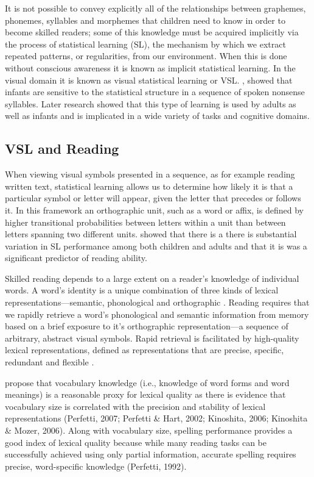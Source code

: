 \documentclass[review]{elsarticle}
\begin{document}
It is not possible to convey explicitly all of the relationships between graphemes, phonemes, syllables and morphemes that children need to know in order to become skilled readers; some of this knowledge must be acquired implicitly via the process of statistical learning (SL), the mechanism by which we extract repeated patterns, or regularities, from our environment.  When this is done without conscious awareness it is known as implicit statistical learning.  In the visual domain it is known as visual statistical learning or VSL.   \citet{saffranWordSegmentationRole1996}, showed that  infants are sensitive to the statistical structure in a sequence of spoken nonsense syllables.  Later research showed that this type of learning is used by adults as well as infants and is implicated in a wide variety of tasks and cognitive domains.

\subsection{ VSL and Reading}

When viewing visual symbols presented in a sequence, as for example reading written text, statistical learning allows us to determine how likely it is that a particular symbol or letter will appear, given the letter that precedes or follows it. In this framework an orthographic unit, such as a word or affix, is defined by higher transitional probabilities between letters within a unit than between letters spanning two different units.	\citet{arciuliStatisticalLearningRelated2012} showed that there is a there is substantial variation in SL performance among both children and adults and that it is was a significant predictor of reading ability.

Skilled reading depends to a large extent on a reader's knowledge of individual words.	A word's identity is a unique combination of three kinds of lexical representations—semantic, phonological and orthographic \citep{perfettiLexicalQualityRevisited2017}. Reading requires that we rapidly retrieve a word’s phonological and semantic information from memory based on a brief exposure to it's orthographic representation—a sequence of arbitrary, abstract visual symbols. Rapid retrieval is facilitated by high-quality lexical representations, defined as representations that are precise, specific, redundant and flexible \citep{perfettiReadingAbilityLexical2007}. 

\citet{yapIndividualDifferencesJoint2009} propose that vocabulary knowledge (i.e., knowledge of word forms and word meanings) is a reasonable proxy for lexical quality as there is evidence that vocabulary size is correlated with the precision and stability of lexical representations (Perfetti, 2007; Perfetti \& Hart, 2002; Kinoshita, 2006; Kinoshita \& Mozer, 2006).  Along with vocabulary size, spelling performance provides a good index of lexical quality because while many reading tasks can be successfully achieved using only partial information, accurate spelling requires precise, word-specific knowledge (Perfetti, 1992).
\end{document}
